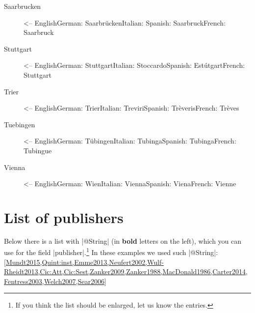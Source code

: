 \documentclass[a4paper,
10pt,
greek,
french,
spanish,
italian,
ngerman,
english,
]{ltxdoc}
\begin{document}
\begin{multicols}{3}
\begin{description}
\item[Saarbrucken] <-- English\newline German: Saarbrücken\newline Italian: \newline Spanish: Saarbruck\newline French: Saarbruck
\item[Stuttgart] <-- English\newline German: Stuttgart\newline Italian: Stoccardo\newline Spanish: Estútgart\newline French: Stuttgart
\item[Trier] <-- English\newline German: Trier\newline Italian: Treviri\newline Spanish: Trèveris\newline French: Trèves
\item[Tuebingen] <-- English\newline German: Tübingen\newline Italian: Tubinga\newline Spanish: Tubinga\newline French: Tubingue
\item[Vienna] <-- English\newline German: Wien\newline Italian: Vienna\newline Spanish: Viena\newline French: Vienne
\end{description}
\end{multicols}
\section{List of publishers}\label{list-publishers}
Below there is a list with |@String| (in \textbf{bold} letters on the left), which you can use for the field |publisher|.\footnote{If you think the list should be enlarged, let us know the entries.}
In these examples we used such |@String|:
\cref{Mundt2015,Quint:inst,Emme2013,Neufert2002,Wulf-Rheidt2013,Cic:Att,Cic:Sest,Zanker2009,Zanker1988,MacDonald1986,Carter2014,Fentress2003,Welch2007,Sear2006}
\end{document}
